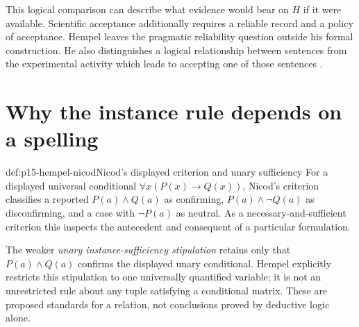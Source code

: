 This logical comparison can describe what evidence would bear on $H$ if it
were available. Scientific acceptance additionally requires a reliable
record and a policy of acceptance. Hempel leaves the pragmatic reliability
question outside his formal construction. He also distinguishes a logical
relationship between sentences from the experimental activity which leads
to accepting one of those sentences
\parencite[I, \S6, pp.~22--26; II, \S10, pp.~114--119]{Hempel1945ConfirmationI,Hempel1945ConfirmationII}.

\section{Why the instance rule depends on a spelling}
\label{sec:p15-hempel-nicod}

\begin{hbdefinition}{def:p15-hempel-nicod}{Nicod's displayed criterion and unary sufficiency}
For a displayed universal conditional $\forall x(P(x)\to Q(x))$, Nicod's
criterion classifies a reported $P(a)\land Q(a)$ as confirming,
$P(a)\land\neg Q(a)$ as disconfirming, and a case with $\neg P(a)$ as
neutral. As a necessary-and-sufficient criterion this inspects the
antecedent and consequent of a particular formulation.

The weaker \emph{unary instance-sufficiency stipulation} retains only that
$P(a)\land Q(a)$ confirms the displayed unary conditional. Hempel explicitly
restricts this stipulation to one universally quantified variable; it is
not an unrestricted rule about any tuple satisfying a conditional matrix.
These are proposed standards for a relation, not conclusions proved by
deductive logic alone.
\end{hbdefinition}

